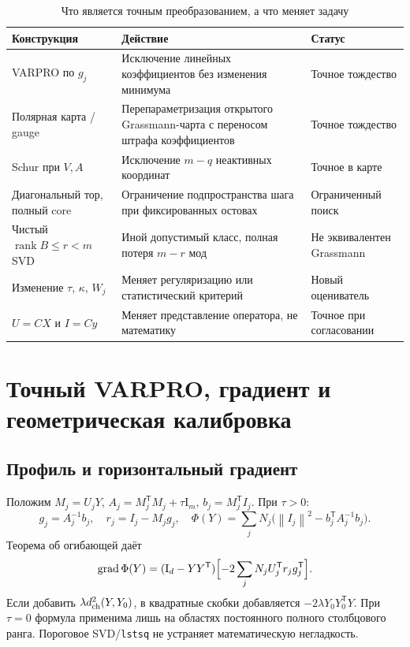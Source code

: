 \documentclass[10.5pt,a4paper]{article}
\newcommand{\I}{\mathrm{I}}
\newcommand{\T}{^{\mathsf T}}
\newcommand{\norm}[1]{\left\|#1\right\|}
\DeclareMathOperator{\rank}{rank}
\DeclareMathOperator{\grad}{grad}
\numberwithin{equation}{section}
\theoremstyle{plain}
\theoremstyle{definition}
\begin{document}
\begin{table}[ht]
\centering\small
\caption{Что является точным преобразованием, а что меняет задачу}
\begin{tabularx}{\linewidth}{@{}P{36mm}L P{31mm}@{}}
\toprule
Конструкция & Действие & Статус\\\midrule
VARPRO по $g_j$ & Исключение линейных коэффициентов без изменения минимума & Точное тождество\\
Полярная карта / gauge & Перепараметризация открытого Grassmann-чарта с переносом штрафа коэффициентов & Точное тождество\\
Schur при $V,A$ & Исключение $m-q$ неактивных координат & Точное в карте\\
Диагональный тор, полный core & Ограничение подпространства шага при фиксированных остовах & Ограниченный поиск\\
Чистый $\rank B\le r<m$ SVD & Иной допустимый класс, полная потеря $m-r$ мод & Не эквивалентен Grassmann\\
Изменение $\tau$, $\kappa$, $W_j$ & Меняет регуляри­зацию или статистический критерий & Новый оцениватель\\
$U=CX$ и $I=Cy$ & Меняет представление оператора, не математику & Точное при согласовании\\
\bottomrule
\end{tabularx}
\label{tab:taxonomy}
\end{table}

\section{Точный VARPRO, градиент и геометрическая калибровка}
\subsection{Профиль и горизонтальный градиент}
Положим $M_j=U_jY$, $A_j=M_j\T M_j+\tau\I_m$, $b_j=M_j\T I_j$. При $\tau>0$:
\begin{equation}
 g_j=A_j^{-1}b_j,\quad r_j=I_j-M_jg_j,\quad
 \Phi(Y)=\sum_jN_j\bigl(\norm{I_j}^2-b_j\T A_j^{-1}b_j\bigr).
 \label{eq:varpro-profile}
\end{equation}
Теорема об огибающей даёт
\begin{equation}
 \grad\Phi(Y)=(\I_d-YY\T)\Bigl[-2\sum_jN_jU_j\T r_jg_j\T\Bigr].
 \label{eq:grad}
\end{equation}
Если добавить $\lambda d_{\rm ch}^2(Y,Y_0)$, в квадратные скобки добавляется $-2\lambda Y_0Y_0\T Y$. При $\tau=0$ формула применима лишь на областях постоянного полного столбцового ранга. Пороговое SVD/\texttt{lstsq} не устраняет математическую негладкость.
\end{document}
